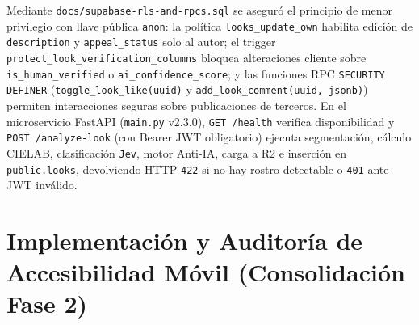 \documentclass[conference]{IEEEtran}
\begin{document}
Mediante \texttt{docs/supabase-rls-and-rpcs.sql} se aseguró el principio de menor privilegio con llave pública \texttt{anon}: la política \texttt{looks\_update\_own} habilita edición de \texttt{description} y \texttt{appeal\_status} solo al autor; el trigger \texttt{protect\_look\_verification\_columns} bloquea alteraciones cliente sobre \texttt{is\_human\_verified} o \texttt{ai\_confidence\_score}; y las funciones RPC \texttt{SECURITY DEFINER} (\texttt{toggle\_look\_like(uuid)} y \texttt{add\_look\_comment(uuid, jsonb)}) permiten interacciones seguras sobre publicaciones de terceros. En el microservicio FastAPI (\texttt{main.py} v2.3.0), \texttt{GET /health} verifica disponibilidad y \texttt{POST /analyze-look} (con Bearer JWT obligatorio) ejecuta segmentación, cálculo CIELAB, clasificación \texttt{Jev}, motor Anti-IA, carga a R2 e inserción en \texttt{public.looks}, devolviendo HTTP \texttt{422} si no hay rostro detectable o \texttt{401} ante JWT inválido.

\section{Implementación y Auditoría de Accesibilidad Móvil (Consolidación Fase 2)}
\end{document}
